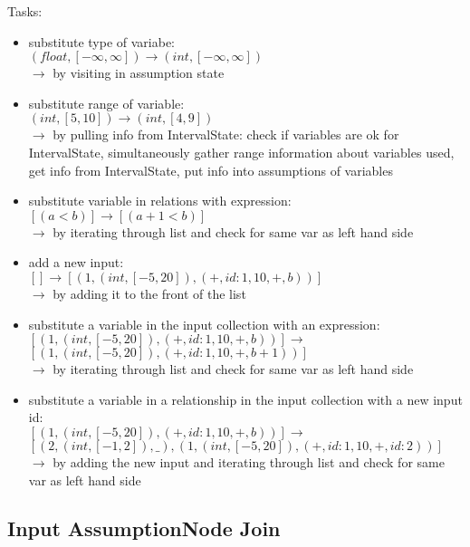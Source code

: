 \documentclass[11pt]{article}
\begin{document}
Tasks:
\begin{itemize}
    \item substitute type of variabe:\\
    $(float, [-\infty, \infty]) \rightarrow (int, [-\infty, \infty])$\\
    $\rightarrow$ by visiting in assumption state
    \item substitute range of variable:\\
    $(int, [5, 10]) \rightarrow (int, [4, 9])$\\
    $\rightarrow$ by pulling info from IntervalState: check if variables are ok for IntervalState, simultaneously gather range information about variables used, get info from IntervalState, put info into assumptions of variables
    \item substitute variable in relations with expression:\\
    $[(a < b)] \rightarrow [(a + 1 < b)]$\\
    $\rightarrow$ by iterating through list and check for same var as left hand side
    \item add a new input:\\
    $[] \rightarrow [(1, (int, [-5, 20]), (+, id{:}1, 10, +, b))]$\\
    $\rightarrow$ by adding it to the front of the list
    \item substitute a variable in the input collection with an expression:\\
    $[(1, (int, [-5, 20]), (+, id{:}1, 10, +, b))] \rightarrow$\\
    $[(1, (int, [-5, 20]), (+, id{:}1, 10, +, b+1))]$\\
    $\rightarrow$ by iterating through list and check for same var as left hand side
    \item substitute a variable in a relationship in the input collection with a new input id:\\
    $[(1, (int, [-5, 20]), (+, id{:}1, 10, +, b))] \rightarrow$\\
    $[(2, (int, [-1, 2]), \_), (1, (int, [-5, 20]), (+, id{:}1, 10, +, id{:}2))]$\\
    $\rightarrow$ by adding the new input and iterating through list and check for same var as left hand side
\end{itemize}


\subsection{Input AssumptionNode Join}
\end{document}
